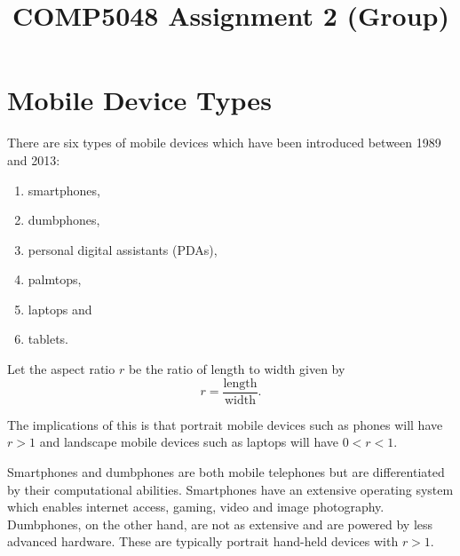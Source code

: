 \documentclass[conference]{IEEEtran}
\begin{document}
\title{COMP5048 Assignment 2 (Group)}

\author{
\and
{}
\and
{}
\and
{}
\and
{}
}

\maketitle

\begin{abstract}
\end{abstract}


\section{Mobile Device Types}

There are six types of mobile devices which have been introduced between 1989
and 2013:
\begin{enumerate}
	\item smartphones,
	\item dumbphones,
	\item personal digital assistants (PDAs),
	\item palmtops,
	\item laptops and
	\item tablets.
\end{enumerate}

Let the aspect ratio $r$ be the ratio of length to width given by
\[ r = \frac{\text{length}}{\text{width}}. \]

The implications of this is that portrait mobile devices such as phones will
have $r>1$ and landscape mobile devices such as laptops will have $0<r<1$.

Smartphones and dumbphones are both mobile telephones but are differentiated by
their computational abilities. Smartphones have an extensive operating system
which enables internet access, gaming, video and image photography. Dumbphones,
on the other hand, are not as extensive and are powered by less advanced
hardware. These are typically portrait hand-held devices with $r>1$.
\end{document}
